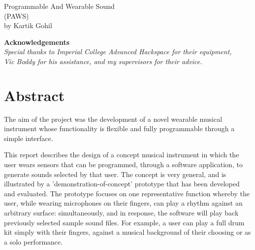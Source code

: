 \thispagestyle{empty}

\begin{tabular}{|l}

\end{tabular}


\vspace{150 pt}
\begin{center}
\huge Programmable And Wearable Sound\\
\LARGE  (PAWS)\\
\bigskip
\LARGE by Kartik Gohil

\end{center}

\vspace{100 pt}
\begin{center}
\textbf{Acknowledgements}\\
\textit{Special thanks to Imperial College Advanced Hackspace for their equipment,\\Vic Boddy for his assistance, and my supervisors for their advice.}\\

\end{center}

\vfill
\normalsize
\section*{Abstract} \label{Project Specification}

The aim of the project was the development of a novel wearable musical instrument whose functionality is flexible and fully programmable through a simple interface.

This report describes the design of a concept musical instrument in which the user wears sensors that can be programmed, through a software application, to generate sounds selected by that user. The concept is very general, and is illustrated by a 'demonstration-of-concept' prototype that has been developed and evaluated.  The prototype focuses on one representative function whereby the user, while wearing microphones on their fingers, can play a rhythm against an arbitrary surface: simultaneously, and in response, the software will play back previously selected sample sound files. For example, a user can play a full drum kit simply with their fingers, against a musical background of their choosing or as a solo performance.

